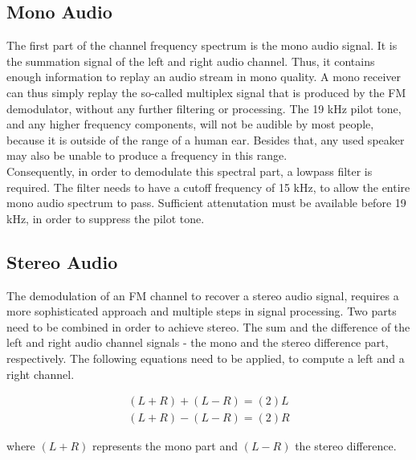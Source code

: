 \subsection{Mono Audio}
\label{subsec:demod_mono}

The first part of the channel frequency spectrum is the mono audio signal.
It is the summation signal of the left and right audio channel.
Thus, it contains enough information to replay an audio stream in mono quality.
A mono receiver can thus simply replay the so-called multiplex signal that is produced by the FM demodulator, without any further filtering or processing.
The 19 kHz pilot tone, and any higher frequency components, will not be audible by most people, because it is outside of the range of a human ear.
Besides that, any used speaker may also be unable to produce a frequency in this range.\\

Consequently, in order to demodulate this spectral part, a lowpass filter is required.
The filter needs to have a cutoff frequency of 15 kHz, to allow the entire mono audio spectrum to pass.
Sufficient attenutation must be available before 19 kHz, in order to suppress the pilot tone.

\subsection{Stereo Audio}

The demodulation of an FM channel to recover a stereo audio signal, requires a more sophisticated approach and multiple steps in signal processing.
Two parts need to be combined in order to achieve stereo.
The sum and the difference of the left and right audio channel signals - the mono and the stereo difference part, respectively.
The following equations need to be applied, to compute a left and a right channel.

\begin{equation}
  \begin{split}
    (L+R) + (L-R) = (2)L \\
    (L+R) - (L-R) = (2)R
    \label{equ_stereo_from_sum_diff}
  \end{split}
\end{equation}

where $(L+R)$ represents the mono part and $(L-R)$ the stereo difference.\\


